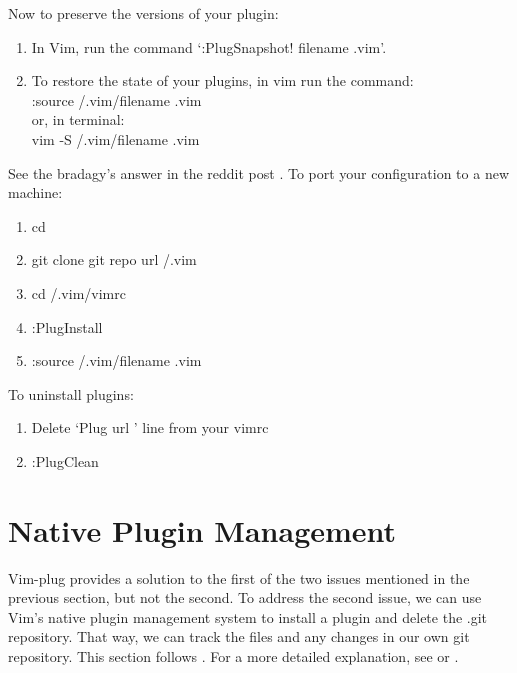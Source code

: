 Now to preserve the versions of your plugin:
\begin{enumerate}
    \item In Vim, run the command `:PlugSnapshot! \tlangle filename \trangle.vim'.
    \item To restore the state of your plugins, in vim run the command:\\
        :source \tsim/.vim/\tlangle filename \trangle.vim\\
        or, in terminal:\\
        vim -S \tsim/.vim/\tlangle filename \trangle.vim
\end{enumerate}
See the bradagy's answer in the reddit post \cite{bradagy2018remember}. To port
your configuration to a new machine:
\begin{enumerate}
    \item cd \tsim
    \item git clone \tlangle git repo url \trangle \tsim/.vim
    \item cd \tsim/.vim/vimrc
    \item :PlugInstall
    \item :source \tsim/.vim/\tlangle filename \trangle.vim
\end{enumerate}
To uninstall plugins:
\begin{enumerate}
    \item Delete `Plug \tlangle url \trangle' line from your vimrc
    \item :PlugClean
\end{enumerate}
\section{Native Plugin Management} \label{SecNativePluginManagement}
Vim-plug provides a solution to the first of the two issues mentioned in the
previous section, but not the second. To address the second issue, we can use
Vim's native plugin management system to install a plugin and delete the .git
repository. That way, we can track the files and any changes in our own git
repository. This section follows \cite{shapeshed2019vim}. For a more
detailed explanation, see \cite{manasthakur2020managing} or \cite{ryder2018attack}.\\

